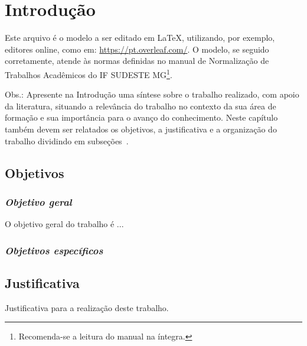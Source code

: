\chapter{Introdução} \label{Introducao}

Este arquivo é o modelo a ser editado em LaTeX, utilizando, por exemplo, editores online, como em: \url{https://pt.overleaf.com/}. O modelo, se seguido corretamente, atende às normas definidas no manual de Normalização de Trabalhos Acadêmicos do IF SUDESTE MG\footnote{Recomenda-se a leitura do manual na íntegra.}.%

Obs.: Apresente na Introdução uma síntese sobre o trabalho realizado, com apoio da literatura, situando a relevância do trabalho no contexto da sua área de formação e sua importância para o avanço do conhecimento. Neste capítulo também devem ser relatados os objetivos, a justificativa e a organização do trabalho dividindo em subseções~\cite{loboguia}. 

\section{Objetivos}

\subsection{\textit{Objetivo geral}}

O objetivo geral do trabalho é ...

\subsection{\textit{Objetivos específicos}}

\section{Justificativa}

Justificativa para a realização deste trabalho.


